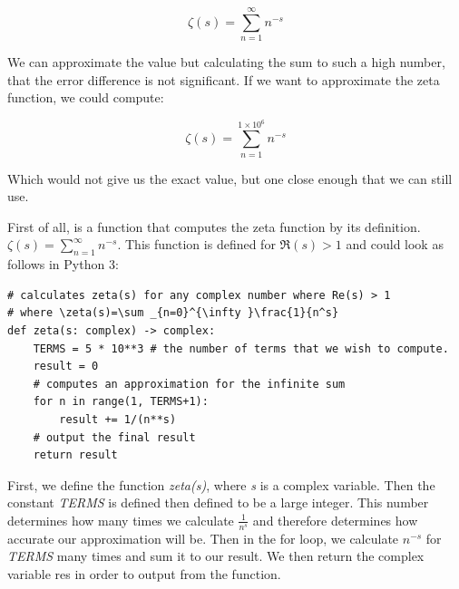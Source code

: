 \documentclass{article}
\begin{document}
$$\zeta(s) = \sum_{n=1}^{\infty} n^{-s}$$

We can approximate the value but calculating the sum to such a high number, that the error difference is not significant. If we want to approximate the zeta function, we could compute:

$$\zeta(s) = \sum_{n=1}^{1 \times 10^6} n^{-s}$$

Which would not give us the exact value, but one close enough that we can still use.

First of all, is a function that computes the zeta function by its definition. $\zeta(s) = \sum_{n=1}^{\infty} n^{-s}$. This function is defined for $\Re(s) > 1$ and could look as follows in Python 3:

\begin{lstlisting}
# calculates zeta(s) for any complex number where Re(s) > 1
# where \zeta(s)=\sum _{n=0}^{\infty }\frac{1}{n^s}
def zeta(s: complex) -> complex:
    TERMS = 5 * 10**3 # the number of terms that we wish to compute.
    result = 0
    # computes an approximation for the infinite sum
    for n in range(1, TERMS+1):
        result += 1/(n**s)
    # output the final result
    return result
\end{lstlisting}

First, we define the function \textit{zeta(s)}, where \textit{s} is a complex variable. Then the constant \textit{TERMS} is defined then defined to be a large integer. This number determines how many times we calculate $\frac{1}{n^s}$ and therefore determines how accurate our approximation will be. Then in the for loop, we calculate $n^{-s}$ for \textit{TERMS} many times and sum it to our result. We then return the complex variable res in order to output from the function.
\end{document}
